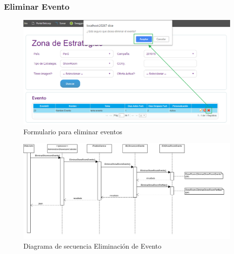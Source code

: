 \documentclass[a4paper,11pt]{paper}
\begin{document}




\newpage
\subsubsection{Eliminar Evento}

\begin{figure}[h]
\centering
\includegraphics[width=1.0\textwidth]{imgs/Eventos/FormularioEliminarEvento.png}
\caption{Formulario para eliminar eventos}
\end{figure}


\begin{landscape}
\begin{figure}[!h]
\centering
\includegraphics[width=1.5\textwidth]{imgs/Eventos/EliminarEvento.png}
\caption{Diagrama de secuencia Eliminación de Evento}
\end{figure}
\end{landscape} 





\end{document}
